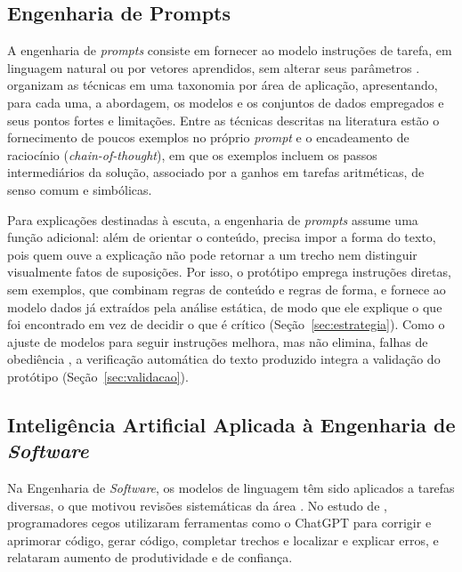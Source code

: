 \documentclass[
    12pt,                   %
    openright,              %
    oneside,                %
    a4paper,                %
    sumario=tradicional,    %
    english,                %
    brazil,                 %
    ]{abntex2}
\begin{document}
\subsection{Engenharia de Prompts}\label{sec:prompts}

A engenharia de \textit{prompts} consiste em fornecer ao modelo instruções de tarefa, em linguagem natural ou por vetores aprendidos, sem alterar seus parâmetros \cite{sahoo2024prompt}. \textcite{sahoo2024prompt} organizam as técnicas em uma taxonomia por área de aplicação, apresentando, para cada uma, a abordagem, os modelos e os conjuntos de dados empregados e seus pontos fortes e limitações. Entre as técnicas descritas na literatura estão o fornecimento de poucos exemplos no próprio \textit{prompt} \cite{brown2020fewshot} e o encadeamento de raciocínio (\textit{chain-of-thought}), em que os exemplos incluem os passos intermediários da solução, associado por \textcite{wei2022cot} a ganhos em tarefas aritméticas, de senso comum e simbólicas.

Para explicações destinadas à escuta, a engenharia de \textit{prompts} assume uma função adicional: além de orientar o conteúdo, precisa impor a forma do texto, pois quem ouve a explicação não pode retornar a um trecho nem distinguir visualmente fatos de suposições. Por isso, o protótipo emprega instruções diretas, sem exemplos, que combinam regras de conteúdo e regras de forma, e fornece ao modelo dados já extraídos pela análise estática, de modo que ele explique o que foi encontrado em vez de decidir o que é crítico (Seção~\ref{sec:estrategia}). Como o ajuste de modelos para seguir instruções melhora, mas não elimina, falhas de obediência \cite{ouyang2022instructions}, a verificação automática do texto produzido integra a validação do protótipo (Seção~\ref{sec:validacao}).

\subsection{Inteligência Artificial Aplicada à Engenharia de \textit{Software}}\label{sec:IAES}

Na Engenharia de \textit{Software}, os modelos de linguagem têm sido aplicados a tarefas diversas, o que motivou revisões sistemáticas da área \cite{hou2024llmse}. No estudo de \textcite{latinoware34224}, programadores cegos utilizaram ferramentas como o ChatGPT para corrigir e aprimorar código, gerar código, completar trechos e localizar e explicar erros, e relataram aumento de produtividade e de confiança.
\end{document}
